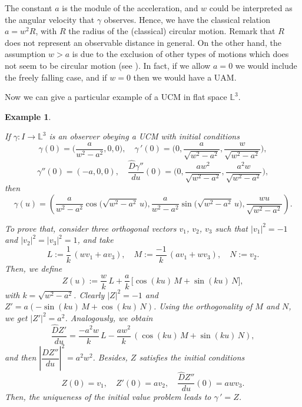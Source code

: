 \documentclass[11pt]{book}
\newtheorem{ex}[defi]{Example}
\def\L{\mathbb L}
\begin{document}
The constant $a$ is the module of the acceleration, and $w$ could be interpreted as the angular velocity that $\gamma$ observes. Hence, we have the classical relation $a=w^2 R$, with $R$ the radius of the (classical) circular motion. Remark that $R$ does not represent an observable distance in general.
On the other hand, the assumption $w>a$ is due to the exclusion of other types of motions which does not seem to be circular motion (see \cite{UCM}). In fact, if we allow $a=0$ we would include the freely falling case, and if $w=0$ then we would have a UAM.  

\vspace{2mm}
Now we can give a particular example of a UCM in flat space $\L^3$.
\begin{ex}\label{example UCM}
	{\rm 
		If $\gamma:I\to \L^3$ is an observer obeying a UCM with initial conditions
		\[
		\gamma(0)=\Big(\frac{a}{w^2-a^2},0,0\Big),\quad \gamma{\,'}(0)=\Big(0, \frac{a}{\sqrt{w^2-a^2}}, \frac{w}{\sqrt{w^2-a^2}} \Big),
		\]
		\[
		\gamma''(0)=(-a,0,0), \quad \frac{\widehat{D}\gamma''}{du}(0)=\Big(0, \frac{aw^2}{\sqrt{w^2-a^2}},\frac{a^2 w}{\sqrt{w^2-a^2}}\Big),
		\]
		then
		\begin{equation}
			\gamma(u)=\left( \frac{a}{w^2-a^2}\cos\big(\sqrt{w^2-a^2}\,u\big),\frac{a}{w^2-a^2}\sin\big(\sqrt{w^2-a^2}\,u\big), \frac{wu}{\sqrt{w^2-a^2}}  \right).
		\end{equation}
		
		To prove that, consider three orthogonal vectors $v_1$, $v_2$, $v_3$ such that $|v_1|^2=-1$ and $|v_2|^2=|v_3|^2=1$, and take
		\[
		L:=\frac{1}{k}\,(wv_1+av_3), \quad M:=\frac{-1}{k}\,(av_1+wv_3), \quad N:=v_2.
		\]
		Then, we define 
		\[
		Z(u):=\frac{w}{k}\,L+ \frac{a}{k}\,\big[\cos(ku)\,M+\sin(ku)\,N\big],
		\]
		with $k=\sqrt{w^2-a^2}$.
		Clearly $|Z|^2=-1$ and $Z'=a(-\sin(ku)\,M+\cos(ku)\,N)$.
		Using the orthogonality of $M$ and $N$, we get $|Z'|^2=a^2$. Analogously, we obtain
		\[
		\frac{\widehat{D}Z'}{du}=\frac{-a^2w}{k}\,L-\frac{aw^2}{k}\,(\cos(ku)\,M+\sin(ku)\,N),
		\]
		and then $\left|\dfrac{\widehat{D}Z''}{du}\right|^2=a^2w^2$. Besides, $Z$ satisfies the initial conditions
		\[
		Z(0)=v_1,\quad Z'(0)=av_2, \quad \frac{\widehat{D}Z''}{du}(0)=awv_3.
		\]
		Then, the uniqueness of the initial value problem leads to $\gamma{\,'}=Z$.
	}
\end{ex}
\end{document}
